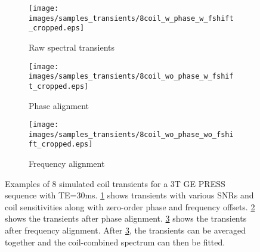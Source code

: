 \begin{figure}[t]
    \centering
    \begin{subfigure}{0.32\textwidth}
        \texttt{[image: images/samples\_transients/8coil\_w\_phase\_w\_fshift\_cropped.eps]}
        \caption{Raw spectral transients}
        \label{subfig:raw transients}        
    \end{subfigure}
    \begin{subfigure}{0.32\textwidth}
        \texttt{[image: images/samples\_transients/8coil\_wo\_phase\_w\_fshift\_cropped.eps]}
        \caption{Phase alignment}
        \label{subfig:phase alignment}        
    \end{subfigure}
    \begin{subfigure}{0.32\textwidth}
        \texttt{[image: images/samples\_transients/8coil\_wo\_phase\_wo\_fshift\_cropped.eps]}
        \caption{Frequency alignment}
        \label{subfig:frequency alignment}        
    \end{subfigure}
    \caption{Examples of 8 simulated coil transients for a 3T GE PRESS sequence with TE=30ms. \ref{subfig:raw transients} shows transients with various SNRs and coil sensitivities along with zero-order phase and frequency offsets. \ref{subfig:phase alignment} shows the transients after phase alignment. \ref{subfig:frequency alignment} shows the transients after frequency alignment. After \ref{subfig:frequency alignment}, the transients can be averaged together and the coil-combined spectrum can then be fitted.}
    \label{fig:simulated transients}
\end{figure}
